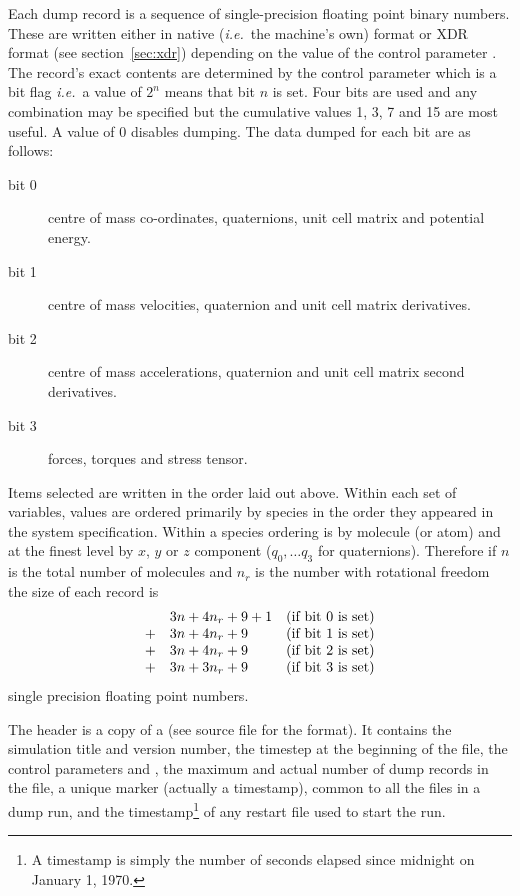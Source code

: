\documentclass[a4paper,twoside]{report}
\newcommand{\ie}{\emph{i.e.}}
\begin{document}
Each dump record is a sequence of single-precision floating point
binary numbers.  These are written either in native (\ie\ the
machine's own) format or XDR format (see section~\ref{sec:xdr})
depending on the value of the control parameter .  The
record's exact contents are determined by the control parameter
 which is a bit flag \ie\ a value of $2^{n}$
means that bit $n$ is set.  Four bits are used and any combination may
be specified but the cumulative values 1, 3, 7 and 15 are most
useful.  A value of 0 disables dumping. The data dumped for each bit
are as follows:
\begin{description}
\item[bit 0]    centre of mass co-ordinates, quaternions, unit cell matrix 
and potential energy.         
\item[bit 1]    centre of mass velocities, quaternion and unit cell
matrix derivatives.
\item[bit 2]    centre of mass accelerations, quaternion and unit cell
matrix second derivatives.
\item[bit 3]    forces, torques and stress tensor.
\end{description}
Items selected are written in the order laid out above.  Within each
set of variables, values are ordered primarily by species in the order
they appeared in the system specification.  Within a species ordering
is by molecule (or atom) and at the finest level by $x$, $y$ or $z$
component ($q_{0}, \ldots q_{3}$ for quaternions). Therefore if $n$ is
the total number of molecules and $n_{r}$ is the number with
rotational freedom the size of each record is
\begin{displaymath}
\begin{array}{cll}
   & 3n + 4n_{r} + 9 + 1 & \textnormal{(if bit 0 is set)} \\
 + & 3n + 4n_{r} + 9 & \textnormal{(if bit 1 is set)} \\
 + & 3n + 4n_{r} + 9 & \textnormal{(if bit 2 is set)} \\
 + & 3n + 3n_{r} + 9 & \textnormal{(if bit 3 is set)} \\
\end{array}
\end{displaymath}
single precision floating point numbers.

The header is a copy of a  (see
source file  for the format). It contains the simulation
title and version number, the timestep at the beginning of the file,
the control parameters  and , the
maximum and actual number of dump records in the file, a unique marker
(actually a timestamp), common to all the files in a dump run, and the
timestamp\footnote{A timestamp is simply the number of seconds elapsed
  since midnight on January 1, 1970.} of any restart file used to
start the run.
\end{document}
